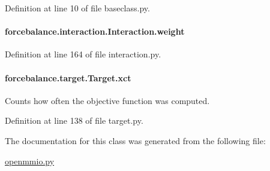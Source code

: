 Definition at line 10 of file baseclass.\-py.

\hypertarget{classforcebalance_1_1interaction_1_1Interaction_a68a6e43e48ec75f375fb987e177126a9}{
\paragraph[{weight}]{\setlength{\rightskip}{0pt plus 5cm}forcebalance.\-interaction.\-Interaction.\-weight\hspace{0.3cm}{\ttfamily [inherited]}}}\label{classforcebalance_1_1interaction_1_1Interaction_a68a6e43e48ec75f375fb987e177126a9}


Definition at line 164 of file interaction.\-py.

\hypertarget{classforcebalance_1_1target_1_1Target_aad2e385cfbf7b4a68f1c2cb41133fe82}{
\paragraph[{xct}]{\setlength{\rightskip}{0pt plus 5cm}forcebalance.\-target.\-Target.\-xct\hspace{0.3cm}{\ttfamily [inherited]}}}\label{classforcebalance_1_1target_1_1Target_aad2e385cfbf7b4a68f1c2cb41133fe82}


Counts how often the objective function was computed. 



Definition at line 138 of file target.\-py.



The documentation for this class was generated from the following file\-:\begin{DoxyCompactItemize}
\item 
\hyperlink{openmmio_8py}{openmmio.\-py}\end{DoxyCompactItemize}
